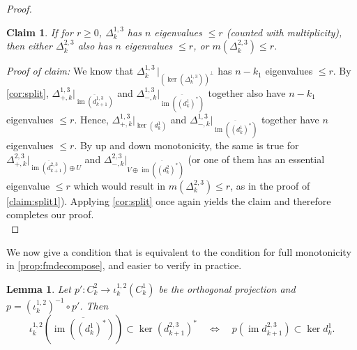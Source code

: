 \documentclass[11pt]{article}
\newtheorem{lemma}[theorem]{Lemma}
\newtheorem{claim}{Claim}[theorem]
\theoremstyle{definition}
\theoremstyle{remark}
\DeclareMathOperator{\im}{im}
\begin{document}
\begin{proof}
        \begin{claim}
            If for $r \ge 0$, $\Delta_k^{1,3}$ has $n$ eigenvalues $\le r$ (counted with multiplicity), then either $\Delta_k^{2,3}$ also has $n$ eigenvalues $\le r$, or $m(\Delta_k^{2,3}) \le r$.
        \end{claim}

       \textit{Proof of claim:} We know that $\Delta_k^{1,3}\, |_{(\ker(\Delta_k^{1,3}))^\perp}$ has $n-k_1$ eigenvalues $\le r$. By \cref{cor:split}, $\Delta_{+,k}^{1,3}|_{\overline{\im(d_{k+1}^{1,3})}}$ and $\Delta_{-,k}^{1,3}|_{\overline{\im((d_k^1)^*)}}$ together also have $n-k_1$ eigenvalues $\le r$. Hence, $\Delta_{+,k}^{1,3}|_{\ker(d_k^1)}$ and $\Delta_{-,k}^{1,3}|_{\overline{\im((d_k^1)^*)}}$ together have $n$ eigenvalues $\le r$. By up and down monotonicity, the same is true for $\Delta_{+,k}^{2,3}|_{\overline{\im(d_{k+1}^{2,3})}\oplus U}$ and $\Delta_{-,k}^{2,3}|_{V \oplus \overline{\im((d_k^2)^*)}}$ (or one of them has an essential eigenvalue $\le r$ which would result in $m(\Delta_k^{2,3})\le r$, as in the proof of \cref{claim:split1}). Applying \cref{cor:split} once again yields the claim and therefore completes our proof.\\
\end{proof}

We now give a condition that is equivalent to the condition for full monotonicity in \cref{prop:fmdecompose}, and easier to verify in practice.

\begin{lemma}
    Let $p':C^2_k\to \iota^{1,2}_k(C^1_k)$ be the orthogonal projection and $p=(\iota_k^{1,2})^{-1}\circ p'$. Then 
    $$
        \iota_k^{1,2} \left(\overline{\im((d_k^1)^*)}\right) \subset \ker(d_{k+1}^{2,3})^* \quad
        \Leftrightarrow \quad p(\im d^{2,3}_{k+1})\subset \ker d^1_{k}.
    $$
\end{lemma}
\end{document}
